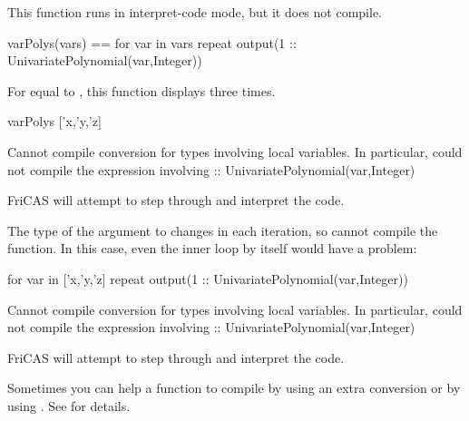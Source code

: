 \begin{xtc}
\begin{xtccomment}
This function runs in interpret-code mode, but it does not compile.
\end{xtccomment}
\begin{spadsrc}
varPolys(vars) ==
  for var in vars repeat
    output(1 :: UnivariatePolynomial(var,Integer))
\end{spadsrc}
\end{xtc}
\begin{xtc}
\begin{xtccomment}
For  equal to \spad{['x, 'y, 'z]}, this function displays
 three times.
\end{xtccomment}
\begin{spadsrc}
varPolys ['x,'y,'z] 
\end{spadsrc}
\begin{MessageOutput}
   Cannot compile conversion for types involving local variables. In 
      particular, could not compile the expression involving :: 
      UnivariatePolynomial(var,Integer) 
\end{MessageOutput}
\begin{MessageOutput}
   FriCAS will attempt to step through and interpret the code.
\end{MessageOutput}
\end{xtc}
\begin{xtc}
\begin{xtccomment}
The type of the argument to  changes in each iteration,
so \Language{} cannot compile the function.
In this case, even the inner loop by itself would have a problem:
\end{xtccomment}
\begin{spadsrc}
for var in ['x,'y,'z] repeat
  output(1 :: UnivariatePolynomial(var,Integer))
\end{spadsrc}
\begin{MessageOutput}
   Cannot compile conversion for types involving local variables. In 
      particular, could not compile the expression involving :: 
      UnivariatePolynomial(var,Integer) 
\end{MessageOutput}
\begin{MessageOutput}
   FriCAS will attempt to step through and interpret the code.
\end{MessageOutput}
\end{xtc}

Sometimes you can help a function to compile by using an extra conversion
or by using .
See  for details.

